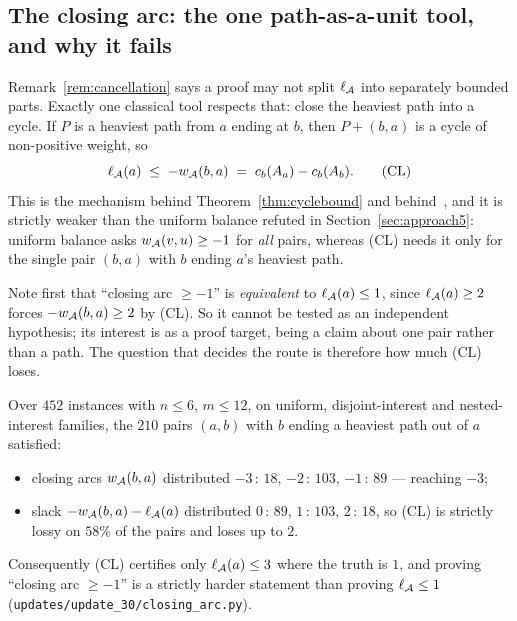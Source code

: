 \subsection{The closing arc: the one path-as-a-unit tool, and why it fails}
\label{sec:approach6-closing-arc}

Remark~\ref{rem:cancellation} says a proof may not split $\ell_{\mathcal{A}}$ into
separately bounded parts. Exactly one classical tool respects that: close the
heaviest path into a cycle. If $P$ is a heaviest path from $a$ ending at $b$, then
$P + (b,a)$ is a cycle of non-positive weight, so
\[
  \ell_{\mathcal{A}}(a) \;\le\; -w_{\mathcal{A}}(b,a)
  \;=\; c_b(A_{a}) - c_b(A_{b}). \tag{CL}
\]
This is the mechanism behind Theorem~\ref{thm:cyclebound} and
behind~\cite[Lemma~4.1]{BDNSV20}, and it is strictly weaker than the uniform
balance refuted in Section~\ref{sec:approach5}: uniform balance asks
$w_{\mathcal{A}}(v,u) \ge -1$ for \emph{all} pairs, whereas (CL) needs it only for
the single pair $(b,a)$ with $b$ ending $a$'s heaviest path.

Note first that ``closing arc $\ge -1$'' is \emph{equivalent} to
$\ell_{\mathcal{A}}(a) \le 1$, since $\ell_{\mathcal{A}}(a) \ge 2$ forces
$-w_{\mathcal{A}}(b,a) \ge 2$ by (CL). So it cannot be tested as an independent
hypothesis; its interest is as a proof target, being a claim about one pair rather
than a path. The question that decides the route is therefore how much (CL) loses.

\begin{proposition}
\label{prop:closing-arc-lossy}
Over $452$ instances with $n \le 6$, $m \le 12$, on uniform, disjoint-interest and
nested-interest families, the $210$ pairs $(a,b)$ with $b$ ending a heaviest path
out of $a$ satisfied:
\begin{itemize}
  \item closing arcs $w_{\mathcal{A}}(b,a)$ distributed $-3\,{:}\,18$,
    $-2\,{:}\,103$, $-1\,{:}\,89$ --- reaching $-3$;
  \item slack $-w_{\mathcal{A}}(b,a) - \ell_{\mathcal{A}}(a)$ distributed
    $0\,{:}\,89$, $1\,{:}\,103$, $2\,{:}\,18$, so (CL) is strictly lossy on
    $58\%$ of the pairs and loses up to $2$.
\end{itemize}
Consequently (CL) certifies only $\ell_{\mathcal{A}}(a) \le 3$ where the truth is
$1$, and proving ``closing arc $\ge -1$'' is a strictly harder statement than
proving $\ell_{\mathcal{A}} \le 1$ (\texttt{updates/update\_30/closing\_arc.py}).
\end{proposition}

